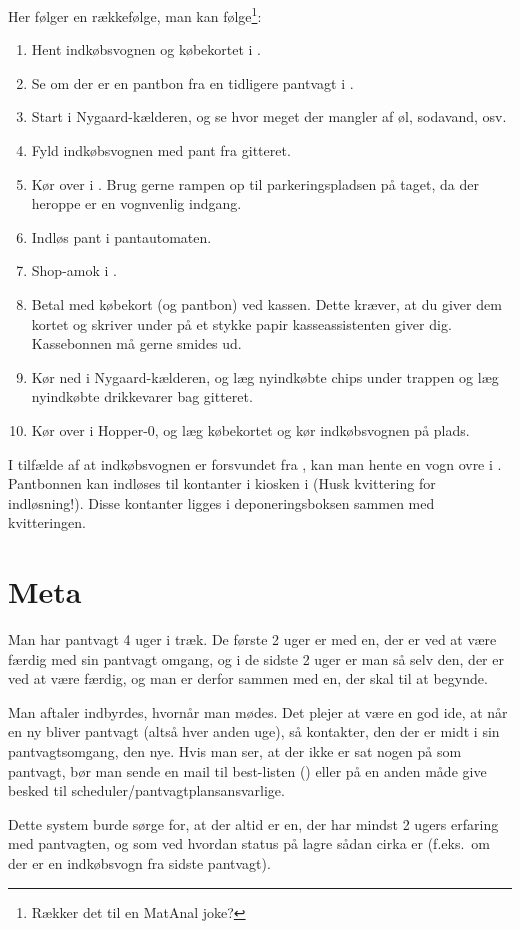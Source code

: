 Her følger en rækkefølge, man kan følge\footnote{Rækker det til en MatAnal joke?}:

\begin{enumerate}
\item Hent indkøbsvognen og købekortet i \shoppingcartloc.
\item Se om der er en pantbon fra en tidligere pantvagt i \shoppingcartloc.
\item Start i Nygaard-kælderen, og se hvor meget der mangler af øl,
  sodavand, osv.
\item Fyld indkøbsvognen med pant fra gitteret.
\item Kør over i \fotex. Brug gerne rampen op til parkeringspladsen på
  taget, da der heroppe er en vognvenlig indgang.
\item Indløs pant i pantautomaten.
\item Shop-amok i \fotex.
\item Betal med købekort (og pantbon) ved kassen. Dette kræver, at du
  giver dem kortet og skriver under på et stykke papir
  kasseassistenten giver dig. Kassebonnen må gerne smides ud.
\item Kør ned i Nygaard-kælderen, og læg nyindkøbte chips under
  trappen og læg nyindkøbte drikkevarer bag gitteret.
\item Kør over i Hopper-0, og læg købekortet og kør indkøbsvognen på plads.
\end{enumerate}

I tilfælde af at indkøbsvognen er forsvundet fra \shoppingcartloc, kan man hente en vogn ovre i \fotex.
Pantbonnen kan indløses til
kontanter i kiosken i \fotex (Husk kvittering for indløsning!). Disse
kontanter ligges i deponeringsboksen sammen med kvitteringen.

\section{Meta}
\label{sec:meta}

Man har pantvagt 4 uger i træk. De første 2 uger er med en, der er ved
at være færdig med sin pantvagt omgang, og i de sidste 2 uger er man
så selv den, der er ved at være færdig, og man er derfor sammen med
en, der skal til at begynde.

Man aftaler indbyrdes, hvornår man mødes. Det plejer at være en god
ide, at når en ny bliver pantvagt (altså hver anden uge), så
kontakter, den der er midt i sin pantvagtsomgang, den nye. Hvis man
ser, at der ikke er sat nogen på som pantvagt, bør man sende en mail
til best-listen (\bestmail) eller på en anden måde
give besked til scheduler/pantvagtplansansvarlige.

Dette system burde sørge for, at der altid er en, der har mindst 2
ugers erfaring med pantvagten, og som ved hvordan status på lagre
sådan cirka er (f.eks.\ om der er en indkøbsvogn fra sidste pantvagt).



